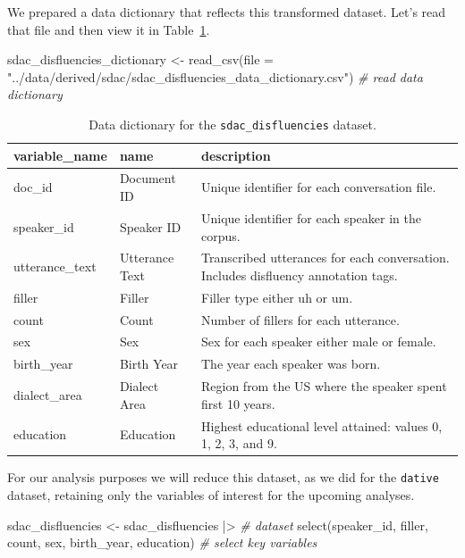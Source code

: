 \documentclass[
  letterpaper,
]{latex/krantz}
\newenvironment{Shaded}{\begin{snugshade}}{\end{snugshade}}
\newcommand{\AttributeTok}[1]{\textcolor[rgb]{0.00,0.00,0.00}{#1}}
\newcommand{\CommentTok}[1]{\textcolor[rgb]{0.00,0.00,0.00}{\textit{#1}}}
\newcommand{\FunctionTok}[1]{\textcolor[rgb]{0.00,0.00,0.00}{#1}}
\newcommand{\NormalTok}[1]{\textcolor[rgb]{0.00,0.00,0.00}{#1}}
\newcommand{\OtherTok}[1]{\textcolor[rgb]{0.00,0.00,0.00}{#1}}
\newcommand{\SpecialCharTok}[1]{\textcolor[rgb]{0.00,0.00,0.00}{#1}}
\newcommand{\StringTok}[1]{\textcolor[rgb]{0.00,0.00,0.00}{#1}}
\begin{document}
We prepared a data dictionary that reflects this transformed dataset.
Let's read that file and then view it in
Table~\ref{tbl-i-sdac-disfluencies-dictionary}.

\begin{Shaded}
\begin{Highlighting}[]
\NormalTok{sdac\_disfluencies\_dictionary }\OtherTok{\textless{}{-}} \FunctionTok{read\_csv}\NormalTok{(}\AttributeTok{file =} \StringTok{"../data/derived/sdac/sdac\_disfluencies\_data\_dictionary.csv"}\NormalTok{) }\CommentTok{\# read data dictionary}
\end{Highlighting}
\end{Shaded}

\hypertarget{tbl-i-sdac-disfluencies-dictionary}{}
\begin{table}
\caption{\label{tbl-i-sdac-disfluencies-dictionary}Data dictionary for the \texttt{sdac\_disfluencies} dataset. }\tabularnewline

\centering
\begin{tabular}{lll}
\toprule
variable\_name & name & description\\
\midrule
doc\_id & Document ID & Unique identifier for each conversation file.\\
speaker\_id & Speaker ID & Unique identifier for each speaker in the corpus.\\
utterance\_text & Utterance Text & Transcribed utterances for each conversation. Includes disfluency annotation tags.\\
filler & Filler & Filler type either uh or um.\\
count & Count & Number of fillers for each utterance.\\
\addlinespace
sex & Sex & Sex for each speaker either male or female.\\
birth\_year & Birth Year & The year each speaker was born.\\
dialect\_area & Dialect Area & Region from the US where the speaker spent first 10 years.\\
education & Education & Highest educational level attained: values 0, 1, 2, 3, and 9.\\
\bottomrule
\end{tabular}
\end{table}

For our analysis purposes we will reduce this dataset, as we did for the
\texttt{dative} dataset, retaining only the variables of interest for
the upcoming analyses.

\begin{Shaded}
\begin{Highlighting}[]
\NormalTok{sdac\_disfluencies }\OtherTok{\textless{}{-}} 
\NormalTok{  sdac\_disfluencies }\SpecialCharTok{|\textgreater{}} \CommentTok{\# dataset}
  \FunctionTok{select}\NormalTok{(speaker\_id, filler, count, sex, birth\_year, education) }\CommentTok{\# select key variables}
\end{Highlighting}
\end{Shaded}
\end{document}
